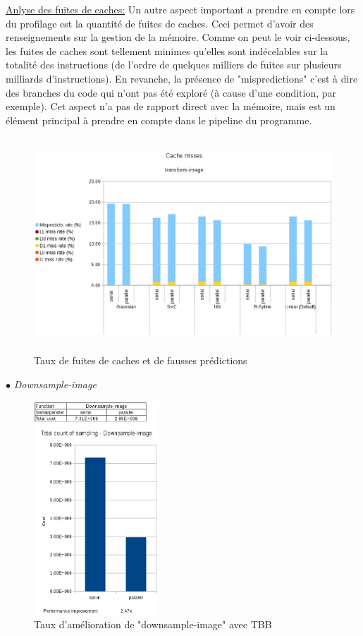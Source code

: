 \documentclass{report}
\begin{document}
\newpage
\underline{Anlyse des fuites de caches:} \newline\newline  
Un autre aspect important a prendre en compte lors du profilage est la quantité de fuites de caches. Ceci permet d'avoir des renseignements sur la gestion de la mémoire. Comme on peut le voir ci-dessous, les fuites de caches sont tellement minimes qu'elles sont indécelables sur la totalité des instructions (de l'ordre de quelques milliers de fuites sur plusieurs milliards d'instructions). \newline
En revanche, la présence de "mispredictions" c'est à dire des branches du code qui n'ont pas été exploré (à cause d'une condition, par exemple). Cet aspect n'a pas de rapport direct avec la mémoire, mais est un élément principal à prendre en compte dans le pipeline du programme.
\begin{figure}[h!]
	\begin{center}
		\includegraphics[height=8cm]{figures/cache_misses_transform_image.eps}
		\caption{Taux de fuites de caches et de fausses prédictions}
		\label{Taux de fuites de caches et de fausses prédictions}
	\end{center}
\end{figure}
\newline\newline 
{$\bullet$} \textit{Downsample-image} \newline
\begin{figure}
	
	\includegraphics[height=8cm]{figures/downsample_image_costs.eps}
	\caption{Taux d'amélioration de "downsample-image" avec TBB}
	\label{Taux d'amélioration de "downsample-image" avec TBB}
\end{figure}
\end{document}
